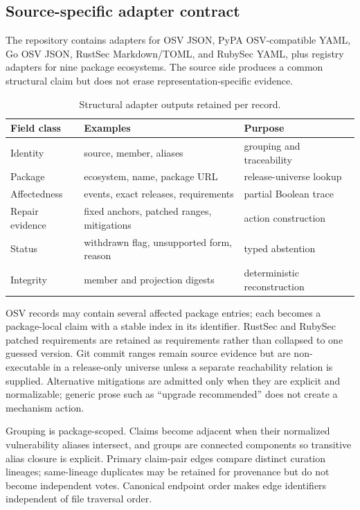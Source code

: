 \documentclass[10pt,conference]{IEEEtran}
\newcommand{\suppTableFont}{\footnotesize}
\begin{document}
\subsection{Source-specific adapter contract}
The repository contains adapters for OSV JSON, PyPA OSV-compatible YAML, Go OSV JSON, RustSec Markdown/TOML, and RubySec YAML, plus registry adapters for nine package ecosystems. The source side produces a common structural claim but does not erase representation-specific evidence.

\begin{table}[t]
\centering
\caption{Structural adapter outputs retained per record.}
\suppTableFont
\begin{tabularx}{\columnwidth}{p{1.45cm}p{1.95cm}X}
\toprule
Field class & Examples & Purpose \\
\midrule
Identity & source, member, aliases & grouping and traceability \\
Package & ecosystem, name, package URL & release-universe lookup \\
Affectedness & events, exact releases, requirements & partial Boolean trace \\
Repair evidence & fixed anchors, patched ranges, mitigations & action construction \\
Status & withdrawn flag, unsupported form, reason & typed abstention \\
Integrity & member and projection digests & deterministic reconstruction \\
\bottomrule
\end{tabularx}
\end{table}

OSV records may contain several affected package entries; each becomes a package-local claim with a stable index in its identifier. RustSec and RubySec patched requirements are retained as requirements rather than collapsed to one guessed version. Git commit ranges remain source evidence but are non-executable in a release-only universe unless a separate reachability relation is supplied. Alternative mitigations are admitted only when they are explicit and normalizable; generic prose such as ``upgrade recommended'' does not create a mechanism action.

Grouping is package-scoped. Claims become adjacent when their normalized vulnerability aliases intersect, and groups are connected components so transitive alias closure is explicit. Primary claim-pair edges compare distinct curation lineages; same-lineage duplicates may be retained for provenance but do not become independent votes. Canonical endpoint order makes edge identifiers independent of file traversal order.
\end{document}
